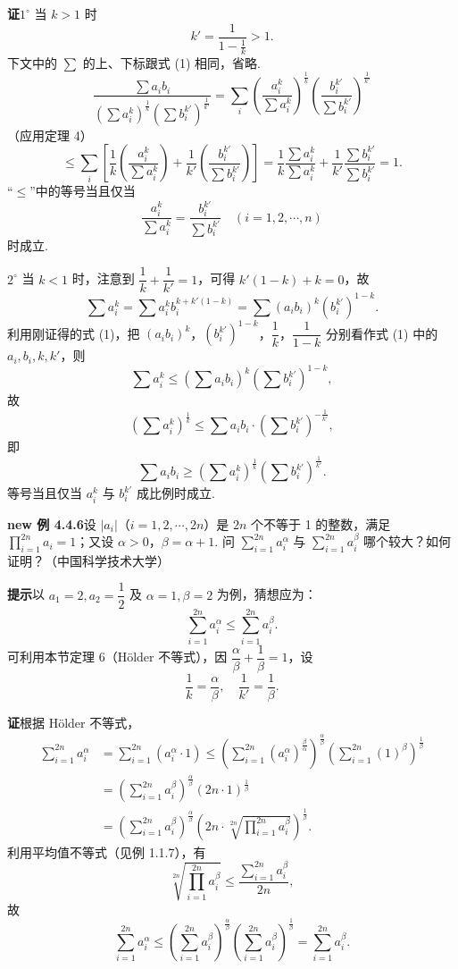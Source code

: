 \documentclass[UTF8, 12pt, fontset=fandol, oneside]{ctexart}
\begin{document}
\noindent\textbf{证}\quad $1^\circ$ 当 $k>1$ 时
\[
k'=\frac1{1-\frac1k}>1.
\]
下文中的 $\sum$ 的上、下标跟式 (1) 相同，省略.
\[
\frac{\sum a_i b_i}{(\sum a_i^k)^{\frac1k}(\sum b_i^{k'})^{\frac1{k'}}}
=\sum_i\left(\frac{a_i^k}{\sum a_i^k}\right)^{\frac1k}
\left(\frac{b_i^{k'}}{\sum b_i^{k'}}\right)^{\frac1{k'}}
\]
（应用定理 4）
\[
\le\sum_i\left[\frac1k\left(\frac{a_i^k}{\sum a_i^k}\right)
+\frac1{k'}\left(\frac{b_i^{k'}}{\sum b_i^{k'}}\right)\right]
=\frac1k\frac{\sum a_i^k}{\sum a_i^k}
+\frac1{k'}\frac{\sum b_i^{k'}}{\sum b_i^{k'}}=1.
\]
“$\le$”中的等号当且仅当
\[
\frac{a_i^k}{\sum a_i^k}=\frac{b_i^{k'}}{\sum b_i^{k'}}
\quad(i=1,2,\cdots,n)
\]
时成立.

$2^\circ$ 当 $k<1$ 时，注意到 $\dfrac1k+\dfrac1{k'}=1$，可得 $k'(1-k)+k=0$，故
\[
\sum a_i^k=\sum a_i^k b_i^{k+k'(1-k)}
=\sum (a_i b_i)^k(b_i^{k'})^{1-k}.
\]
利用刚证得的式 (1)，把 $(a_i b_i)^k$，$(b_i^{k'})^{1-k}$，$\dfrac1k$，$\dfrac1{1-k}$ 分别看作式 (1) 中的 $a_i,b_i,k,k'$，则
\[
\sum a_i^k\le(\sum a_i b_i)^k(\sum b_i^{k'})^{1-k},
\]
故
\[
\left(\sum a_i^k\right)^{\frac1k}
\le \sum a_i b_i\cdot\left(\sum b_i^{k'}\right)^{-\frac1{k'}},
\]
即
\[
\sum a_i b_i\ge
\left(\sum a_i^k\right)^{\frac1k}\left(\sum b_i^{k'}\right)^{\frac1{k'}}.
\]
等号当且仅当 $a_i^k$ 与 $b_i^{k'}$ 成比例时成立.

\noindent\textbf{new 例 4.4.6}\quad 设 $|a_i|$（$i=1,2,\cdots,2n$）是 $2n$ 个不等于 1 的整数，满足
$\displaystyle\prod_{i=1}^{2n}a_i=1$；又设 $\alpha>0$，$\beta=\alpha+1$. 问
$\displaystyle\sum_{i=1}^{2n}a_i^\alpha$ 与
$\displaystyle\sum_{i=1}^{2n}a_i^\beta$ 哪个较大？如何证明？（中国科学技术大学）

\noindent\textbf{提示}\quad 以 $a_1=2,a_2=\dfrac12$ 及 $\alpha=1,\beta=2$ 为例，猜想应为：
\[
\sum_{i=1}^{2n}a_i^\alpha\le\sum_{i=1}^{2n}a_i^\beta.
\]
可利用本节定理 6（Hölder 不等式），因 $\dfrac\alpha\beta+\dfrac1\beta=1$，设
\[
\frac1k=\frac\alpha\beta,\quad \frac1{k'}=\frac1\beta.
\]

\noindent\textbf{证}\quad 根据 Hölder 不等式，
\[
\begin{aligned}
\sum_{i=1}^{2n}a_i^\alpha
&=\sum_{i=1}^{2n}(a_i^\alpha\cdot1)
\le\left(\sum_{i=1}^{2n}(a_i^\alpha)^{\frac\beta\alpha}\right)^{\frac\alpha\beta}
\left(\sum_{i=1}^{2n}(1)^\beta\right)^{\frac1\beta}\\
&=\left(\sum_{i=1}^{2n}a_i^\beta\right)^{\frac\alpha\beta}(2n\cdot1)^{\frac1\beta}\\
&=\left(\sum_{i=1}^{2n}a_i^\beta\right)^{\frac\alpha\beta}
\left(2n\cdot\sqrt[2n]{\prod_{i=1}^{2n}a_i^\beta}\right)^{\frac1\beta}.
\end{aligned}
\]
利用平均值不等式（见例 1.1.7），有
\[
\sqrt[2n]{\prod_{i=1}^{2n}a_i^\beta}\le
\frac{\sum_{i=1}^{2n}a_i^\beta}{2n},
\]
故
\[
\sum_{i=1}^{2n}a_i^\alpha
\le\left(\sum_{i=1}^{2n}a_i^\beta\right)^{\frac\alpha\beta}
\left(\sum_{i=1}^{2n}a_i^\beta\right)^{\frac1\beta}
=\sum_{i=1}^{2n}a_i^\beta.
\]
\end{document}
